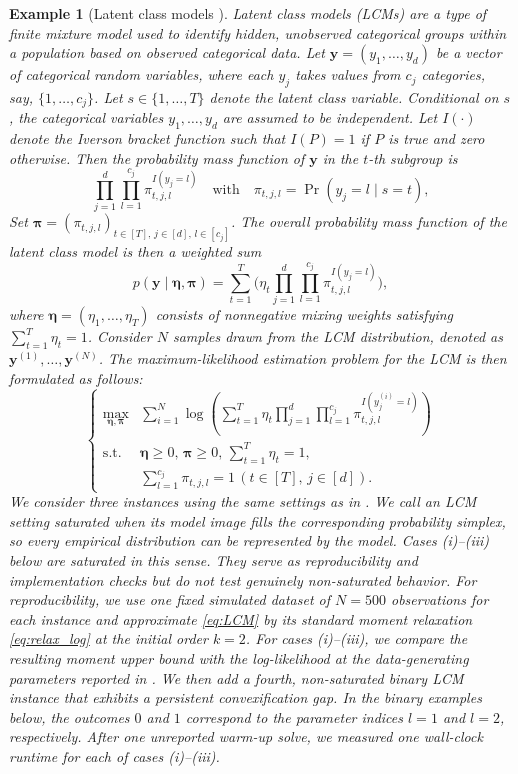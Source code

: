\documentclass[pdflatex,sn-mathphys-num]{sn-jnl}%
\newcommand{\vect}[1]{\boldsymbol{#1}}
\newcommand{\st}{\mathrm{s.t.}}
\theoremstyle{thmstyleone}%
\theoremstyle{thmstyletwo}%
\newtheorem{example}{Example}%
\theoremstyle{thmstylethree}%
\begin{document}
\begin{example}[Latent class models \cite{ChenLCM20}]\label{ex:LCM}
	Latent class models (LCMs) are a type of finite 
	mixture model used to identify hidden, unobserved categorical groups 
	within a population based on observed categorical data.
	Let $\vect{y} = (y_1,\ldots, y_d)$ be a vector of categorical random 
	variables, where each $y_j$ takes values from $c_j$ categories, 
	say, $\{1,\ldots, c_j\}$.
	Let $s\in\{1,\ldots,T\}$ denote the latent class variable.
	Conditional on $s$, the categorical variables
	$y_1,\ldots,y_d$ are assumed to be independent.
	Let $I(\cdot)$ denote the Iverson bracket function
	such that $I(P) = 1$ if $P$ is true and zero otherwise.
	Then the probability mass function of $\vect{y}$ in the $t$-th 
	subgroup is
	\[
	\prod\limits_{j=1}^d\prod\limits_{l=1}^{c_j} \pi_{t,j,l}^{I(y_j=l)}
	\quad \mbox{with}\quad
	\pi_{t,j,l} = \Pr(y_j=l\mid s=t),
	\]
	Set
	$\vect{\pi}=(\pi_{t,j,l})_{t\in[T],\,j\in[d],\,l\in[c_j]}$.
	The overall probability mass function of the latent class model
	is then a weighted sum
	\[
	p(\vect{y}\mid\vect{\eta},\vect{\pi}) = \sum\limits_{t=1}^T
	\Big(\eta_t	\prod\limits_{j=1}^d\prod\limits_{l=1}^{c_j} 
	\pi_{t,j,l}^{I(y_j=l)}\Big),
	\]
	where $\vect{\eta}=(\eta_1,\ldots,\eta_T)$ consists of
	nonnegative mixing weights
	satisfying $\sum_{t=1}^T\eta_t=1$.
	Consider $N$ samples drawn from the LCM distribution, denoted as $\vect{y}^{(1)}, \ldots, \vect{y}^{(N)}$.
	The maximum-likelihood estimation problem for the LCM is then
	formulated as follows:
	\begin{equation}\label{eq:LCM}
		\left\{\begin{array}{cl}
			\max\limits_{\vect{\eta}, \vect{\pi}} & \sum\limits_{i=1}^N \log \left(\sum\limits_{t=1}^T \eta_t	\prod\limits_{j=1}^d\prod\limits_{l=1}^{c_j} \pi_{t,j,l}^{I(y_j^{(i)}=l)}\right)\\
			\st & \vect{\eta}\ge 0,\, \vect{\pi}\ge 0,\, \sum\limits_{t=1}^T\eta_t = 1,\\
			& \sum\limits_{l=1}^{c_j} \pi_{t,j,l} = 1\, ( t\in[T],\, j\in[d]).
		\end{array}
		\right.
	\end{equation}
We consider three instances using the same settings as in \cite{ChenLCM20}.
We call an LCM setting saturated when its model image fills the
corresponding probability simplex, so every empirical distribution can
be represented by the model. Cases (i)--(iii) below are saturated in
this sense. They serve as reproducibility and implementation checks but
do not test genuinely non-saturated behavior.
For reproducibility, we use one fixed simulated dataset of $N=500$
observations for each instance and approximate \eqref{eq:LCM}
by its standard moment relaxation \eqref{eq:relax_log} at the
initial order $k=2$.
For cases (i)--(iii), we compare the resulting moment upper bound
with the log-likelihood at the data-generating parameters reported in
\cite{ChenLCM20}. We then add a fourth, non-saturated binary LCM instance that exhibits a persistent convexification gap.
In the binary examples below, the outcomes $0$ and $1$
correspond to the parameter indices $l=1$ and $l=2$, respectively.
After one unreported warm-up solve, we measured one wall-clock runtime
for each of cases (i)--(iii).
	

\end{example}
\end{document}
